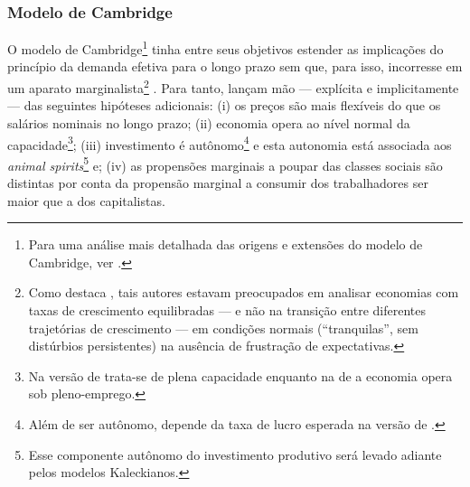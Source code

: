 \subsubsection{Modelo de Cambridge}


O modelo de Cambridge\footnote{Para uma análise mais detalhada das origens e extensões do modelo de Cambridge, ver \textcite{baranzini_cambridge_2013}.} tinha entre seus objetivos estender as implicações do princípio da demanda efetiva para o longo prazo sem que, para isso, incorresse em um aparato marginalista\footnote{
	Como destaca \textcite[p.~127--133]{davidson_accumulation_1978}, tais autores estavam preocupados em analisar economias com taxas de crescimento equilibradas --- e não na transição entre diferentes trajetórias de crescimento --- em condições normais (``tranquilas'', sem distúrbios persistentes) na ausência de frustração de expectativas.
} \cites{kaldor_alternative_1955}{kaldor_model_1957}{robinson_model_1962}{pasinetti_rate_1962}. 
Para tanto, lançam mão --- explícita e implicitamente --- das seguintes hipóteses adicionais: 
	(i) os preços são mais flexíveis do que os salários nominais no longo prazo; 
	(ii) economia opera ao nível normal da capacidade\footnote{
		Na versão de \textcite{robinson_model_1962} trata-se de plena capacidade enquanto na de \textcite{kaldor_alternative_1955} a economia opera sob pleno-emprego.
	}; 
	(iii) investimento é autônomo\footnote{Além de ser autônomo, depende da taxa de lucro esperada na versão de \textcite{robinson_model_1962}.} e esta autonomia está associada aos  \textit{animal spirits}\footnote{Esse componente autônomo do investimento produtivo será levado adiante pelos modelos Kaleckianos.} e;
	(iv) as propensões marginais a poupar das classes sociais são distintas por conta da propensão marginal a consumir dos trabalhadores ser maior que a dos capitalistas. 
	
